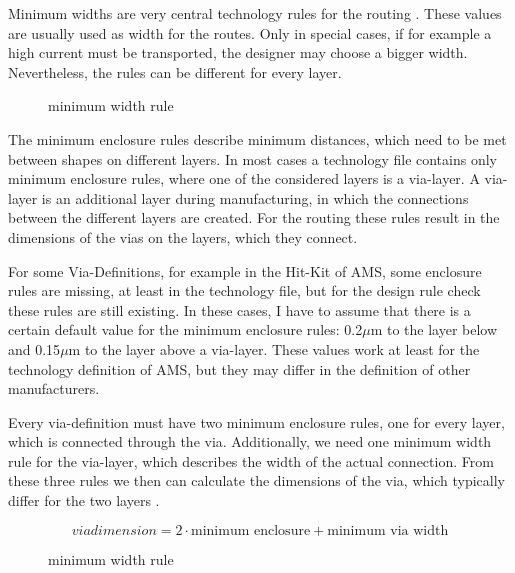 Minimum widths are very central technology rules for the routing . These values are usually used as width for the routes. Only in special cases, if for example a high current must be transported, the designer may choose a bigger width. Nevertheless, the rules can be different for every layer.

\begin{figure}
	\centering
	
	\caption{minimum width rule}
	\label{fig:technology_rule_width}
\end{figure}

The minimum enclosure rules describe minimum distances, which need to be met between shapes on different layers. In most cases a technology file contains only minimum enclosure rules, where one of the considered layers is a via-layer. A via-layer is an additional layer during manufacturing, in which the connections between the different layers are created. For the routing these rules result in the dimensions of the vias on the layers, which they connect.

For some Via-Definitions, for example in the Hit-Kit of AMS, some enclosure rules are missing, at least in the technology file, but for the design rule check these rules are still existing. In these cases, I have to assume that there is a certain default value for the minimum enclosure rules: 0.2$\mu$m to the layer below and 0.15$\mu$m to the layer above a via-layer. These values work at least for the technology definition of AMS, but they may differ in the definition of other manufacturers.

Every via-definition must have two minimum enclosure rules, one for every layer, which is connected through the via. Additionally, we need one minimum width rule for the via-layer, which describes the width of the actual connection. From these three rules we then can calculate the dimensions of the via, which typically differ for the two layers .

\begin{equation}
	\label{eq:via_dimension}
	{via dimension} = 2 \cdot \text{minimum enclosure} + \text{minimum via width}
\end{equation}

\begin{figure}
	\centering
	
	\caption{minimum width rule}
	\label{fig:technology_rule_via_dimensions}
\end{figure}


